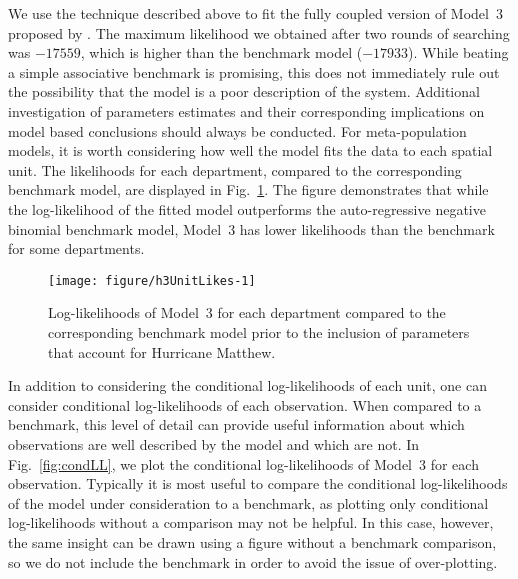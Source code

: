 We use the technique described above to fit the fully coupled version of Model~3 proposed by \cite{lee20}.
The maximum likelihood we obtained after two rounds of searching was $-17559$, which is higher than the benchmark model ($-17933$).
While beating a simple associative benchmark is promising, this does not immediately rule out the possibility that the model is a poor description of the system.
Additional investigation of parameters estimates and their corresponding implications on model based conclusions should always be conducted.
For meta-population models, it is worth considering how well the model fits the data to each spatial unit.
The likelihoods for each department, compared to the corresponding benchmark model, are displayed in Fig.~\ref{fig:h3UnitLikes}.
The figure demonstrates that while the log-likelihood of the fitted model outperforms the auto-regressive negative binomial benchmark model, Model~3 has lower likelihoods than the benchmark for some departments.

\begin{figure}[!ht]
\begin{knitrout}
\color{fgcolor}

{\centering \texttt{[image: figure/h3UnitLikes-1]} 

}


\end{knitrout}
\caption{\label{fig:h3UnitLikes}Log-likelihoods of Model~3 for each department compared to the corresponding benchmark model prior to the inclusion of parameters that account for Hurricane Matthew.}
\end{figure}

In addition to considering the conditional log-likelihoods of each unit, one can consider conditional log-likelihoods of each observation.
When compared to a benchmark, this level of detail can provide useful information about which observations are well described by the model and which are not.
In Fig.~\ref{fig:condLL}, we plot the conditional log-likelihoods of Model~3 for each observation.
Typically it is most useful to compare the conditional log-likelihoods of the model under consideration to a benchmark, as plotting only conditional log-likelihoods without a comparison may not be helpful.
In this case, however, the same insight can be drawn using a figure without a benchmark comparison, so we do not include the benchmark in order to avoid the issue of over-plotting.

